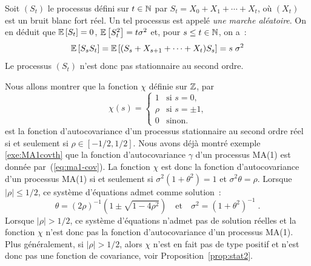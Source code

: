 \begin{example}
\label{ex:marche_aleatoire} Soit $(S_{t})$ le processus d\'efini sur
$t \in \mathbb{N}$ par $S_{t}= X_{0} + X_{1} + \cdots + X_{t}$, o\`u
$(X_{t})$ est un bruit blanc fort r\'eel. Un tel processus est appel\'e
\emph{une marche al\'eatoire}. On en d\'eduit que ${\mathbb E}\left[ S_{t} \right]= 0$,
${\mathbb E}\left[ S_t^2 \right]=t\sigma^2$ et, pour $s\leq t\in\mathbb{N}$, on a~:
\[
{\mathbb E}\left[ S_sS_t \right] = {\mathbb E}\left[  (S_{s} + X_{s+1} + \cdots + X_{t})S_{s} \right]
    = s \; \sigma^2
\]
Le processus $(S_{t})$ n'est donc pas stationnaire au second
ordre.
\end{example}
\begin{example}
 \label{exe:testposivite1}
Nous allons montrer que la fonction $\chi$ d\'efinie sur $\mathbb{Z}$, par
\begin{equation}
  \label{eq:covma1chi}
 \chi(s)=
 \begin{cases}
  1 & \text{si $s=0$,} \\
  \rho & \text{si $s=\pm 1$,} \\
  0 & \text{sinon.}
 \end{cases}
\end{equation}
est la fonction d'autocovariance d'un processus stationnaire au
second ordre r\'eel si et seulement si $\rho \in [-1/2,1/2]$. Nous avons d\'ej\`a
montr\'e exemple \ref{exe:MA1covth} que la fonction d'autocovariance
$\gamma$ d'un processus MA(1) est donn\'ee par~(\ref{eq:ma1-cov}).
La fonction $\chi$ est donc la fonction d'autocovariance d'un
processus MA(1) si et seulement si $\sigma^2(1+\theta^2)= 1$ et
$\sigma^2 \theta = \rho$. Lorsque $|\rho| \leq 1/2$, ce
syst\`eme d'\'equations admet comme solution~:
\[
 \theta = (2 \rho)^{-1}( 1 \pm \sqrt{1 - 4 \rho^2})
 \quad\mbox{et}\quad
 \sigma^2= (1+ \theta^2)^{-1}\;.
\]
Lorsque $|\rho| > 1/2$, ce syst\`eme d'\'equations n'admet pas de solution r\'eelles
et la fonction $\chi$ n'est donc pas la fonction d'autocovariance d'un
processus MA(1). Plus g\'en\'eralement, si $|\rho|>1/2$, alors $\chi$ n'est en
fait pas de type positif et n'est donc pas une fonction de covariance,
voir Proposition~\ref{prop:stat2}.
\end{example}

